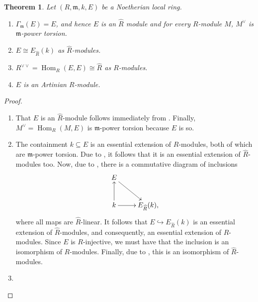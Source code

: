 \documentclass[10pt]{article}
\theoremstyle{thmstyle}
\newtheorem{theorem}{Theorem}[section]
\theoremstyle{defstyle}
\newcommand{\Hom}{\operatorname{Hom}}
\newcommand{\frakm}{\mathfrak{m}} %
\newcommand{\wh}[1]{\widehat{#1}}
\newcommand{\into}{\hookrightarrow}
\begin{document}
\begin{theorem}
    Let $(R,\frakm, k, E)$ be a Noetherian local ring. 
    \begin{enumerate}[label=(\arabic*)]
        \item $\Gamma_{\frakm}(E) = E$, and hence $E$ is an $\wh R$ module and for every $R$-module $M$, $M^\vee$ is $\frakm$-power torsion.
        \item $E\cong E_{\wh R}(k)$ as $\wh R$-modules.
        \item $R^{\vee\vee} = \Hom_R(E, E)\cong\wh R$ as $R$-modules.
        \item $E$ is an Artinian $R$-module.
    \end{enumerate}
\end{theorem}
\begin{proof}
\begin{enumerate}[label=(\arabic*)]
    \item That $E$ is an $\wh R$-module follows immediately from . Finally, $M^\vee = \Hom_R(M, E)$ is $\frakm$-power torsion because $E$ is so.

    \item The containment $k\subseteq E$ is an essential extension of $R$-modules, both of which are $\frakm$-power torsion. Due to , it follows that it is an essential extension of $\wh R$-modules too. Now, due to , there is a commutative diagram of inclusions 
    \begin{equation*}
        \xymatrix {
            E\ar[rd]\\
            k\ar[u]\ar[r] & E_{\wh R}(k),
        }
    \end{equation*}
    where all maps are $\wh R$-linear. It follows that $E\into E_{\wh R}(k)$ is an essential extension of $\wh R$-modules, and consequently, an essential extension of $R$-modules. Since $E$ is $R$-injective, we must have that the inclusion is an isomorphism of $R$-modules. Finally, due to , this is an isomorphism of $\wh R$-modules.

    \item %


\end{enumerate}
\end{proof}
\end{document}
